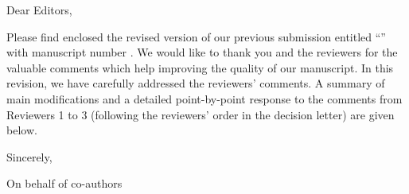 Dear Editors,

Please find enclosed the revised version of our previous submission entitled \enquote{\printtitle} with manuscript number \printmanuscript.
We would like to thank you and the reviewers for the valuable comments which help improving the quality of our manuscript.
In this revision, we have carefully addressed the reviewers' comments.
A summary of main modifications and a detailed point-by-point response to the comments from Reviewers 1 to 3 (following the reviewers' order in the decision letter) are given below.

\vspace{1.2em}

Sincerely,

\vspace{1.7em}

\printauthor

On behalf of co-authors

